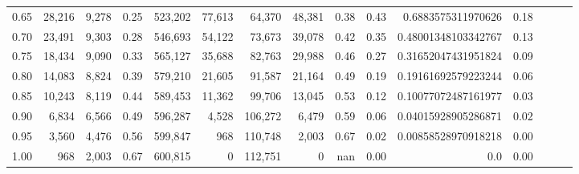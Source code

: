 \begin{tabular}{rrrrrrrrrrrrrrr}
0.65 &  28,216 &  9,278 &  0.25 &  523,202 &   77,613 &   64,370 &   48,381 &  0.38 &  0.43 &   0.6883575311970626 &      0.18 \\
0.70 &  23,491 &  9,303 &  0.28 &  546,693 &   54,122 &   73,673 &   39,078 &  0.42 &  0.35 &  0.48001348103342767 &      0.13 \\
0.75 &  18,434 &  9,090 &  0.33 &  565,127 &   35,688 &   82,763 &   29,988 &  0.46 &  0.27 &  0.31652047431951824 &      0.09 \\
0.80 &  14,083 &  8,824 &  0.39 &  579,210 &   21,605 &   91,587 &   21,164 &  0.49 &  0.19 &  0.19161692579223244 &      0.06 \\
0.85 &  10,243 &  8,119 &  0.44 &  589,453 &   11,362 &   99,706 &   13,045 &  0.53 &  0.12 &  0.10077072487161977 &      0.03 \\
0.90 &   6,834 &  6,566 &  0.49 &  596,287 &    4,528 &  106,272 &    6,479 &  0.59 &  0.06 &  0.04015928905286871 &      0.02 \\
0.95 &   3,560 &  4,476 &  0.56 &  599,847 &      968 &  110,748 &    2,003 &  0.67 &  0.02 &  0.00858528970918218 &      0.00 \\
1.00 &     968 &  2,003 &  0.67 &  600,815 &        0 &  112,751 &        0 &   nan &  0.00 &                  0.0 &      0.00 \\
\bottomrule
\end{tabular}
